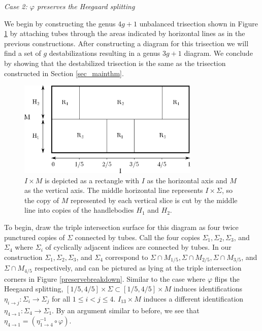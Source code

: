 \documentclass[12pt]{amsart}
\theoremstyle{definition}
\theoremstyle{remark}
\begin{document}
\smallskip
\noindent\textit{Case 2: $\varphi$ preserves the Heegaard splitting}\ \

We begin by constructing the genus $4g+1$ unbalanced trisection shown in Figure \ref{unbalancedbreakdown} by attaching tubes through the areas indicated by horizontal lines as in the previous constructions.
After constructing a diagram for this trisection we will find a set of $g$ destabilizations resulting in a genus $3g+1$ diagram.
We conclude by showing that the destabilized trisection is the same as the trisection constructed in Section \ref{sec_mainthm}.

\begin{figure}[h]
\centering
\includegraphics[height=1.8in]{MxS1_unbalanced.png}
\caption{$I \times M$ is depicted as a rectangle with $I$ as the horizontal axis and $M$ as the vertical axis.
The middle horizontal line represents $I \times \Sigma$, so the copy of $M$ represented by each vertical slice is cut by the middle line into copies of the handlebodies $H_1$ and $H_2$.}
\label{unbalancedbreakdown}
\end{figure}

To begin, draw the triple intersection surface for this diagram as four twice punctured copies of $\Sigma$ connected by tubes.
Call the four copies $\Sigma_1, \Sigma_2, \Sigma_3$, and $\Sigma_4$ where $\Sigma_i$ of cyclically adjacent indices are connected by tubes.
In our construction $\Sigma_1, \Sigma_2, \Sigma_3$, and $\Sigma_4$ correspond to $\Sigma \cap M_{1/5}, \Sigma \cap M_{2/5}, \Sigma \cap M_{3/5}$, and $\Sigma \cap M_{4/5}$ respectively, and can be pictured as lying at the triple intersection corners in Figure \ref{preservebreakdown}.
Similar to the case where $\varphi$ flips the Heegaard splitting, $[1/5, 4/5] \times \Sigma \subset [1/5, 4/5] \times M$ induces identifications $\eta_{i \to j}\colon \Sigma_i \to \Sigma_j$ for all $1 \le i < j \le 4$.
$I_{13} \times M$ induces a different identification $\eta_{4 \to 1}\colon \Sigma_4 \to \Sigma_1$.
By an argument similar to before, we see that $\eta_{4 \to 1} = (\eta_{1 \to 4}^{-1} \circ \varphi)$.
\end{document}
